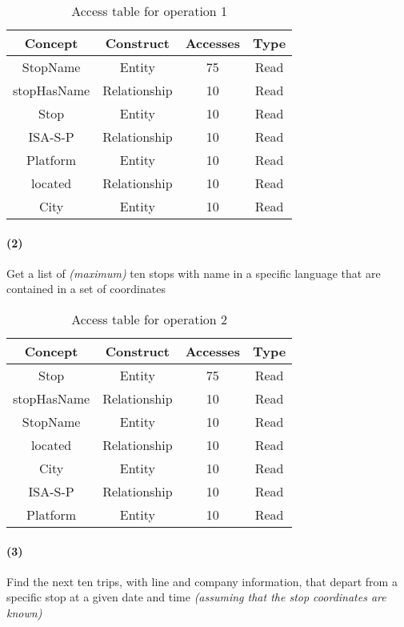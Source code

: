 	\begin{table}[h!]
		\centering
		\begin{tabular}{|c|c|c|c|}
			\hline
			\textbf{Concept} & \textbf{Construct} & \textbf{Accesses} & \textbf{Type} \\
			\hline
			StopName & Entity & 75 & Read \\ \hline
			stopHasName & Relationship & 10 & Read \\ \hline
			Stop & Entity & 10 & Read \\ \hline 
			ISA-S-P & Relationship & 10 & Read \\ \hline
			Platform & Entity & 10 & Read \\ \hline
			located & Relationship & 10 & Read \\ \hline
			City & Entity & 10 & Read \\ \hline
		\end{tabular}
		\caption{Access table for operation 1}\label{tbl:access-1}
	\end{table}

	\paragraph{(2)} Get a list of \textit{(maximum)} ten stops with name in a specific language that are contained in a set of coordinates
	
	\begin{table}[h!]
		\centering
		\begin{tabular}{|c|c|c|c|}
			\hline
			\textbf{Concept} & \textbf{Construct} & \textbf{Accesses} & \textbf{Type} \\
			\hline
			Stop & Entity & 75 & Read \\ \hline 
			stopHasName & Relationship & 10 & Read \\ \hline
			StopName & Entity & 10 & Read \\ \hline
			located & Relationship & 10 & Read \\ \hline
			City & Entity & 10 & Read \\ \hline
			ISA-S-P & Relationship & 10 & Read \\ \hline
			Platform & Entity & 10 & Read \\ \hline
		\end{tabular}
		\caption{Access table for operation 2}\label{tbl:access-2}
	\end{table}

	\newpage
	\paragraph{(3)} Find the next ten trips, with line and company information, that depart from a specific stop at a given date and time \textit{(assuming that the stop coordinates are known)}

